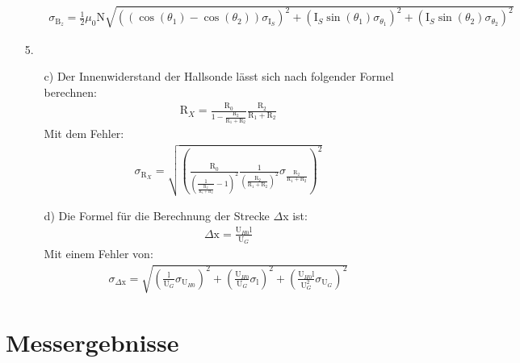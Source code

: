 \documentclass[12pt]{scrartcl}
\begin{document}
\begin{enumerate}
\begin{enumerate}
\begin{align}
\sigma_{\text{B}_z} = \frac{1}{2} \mu_0 \text{N}
\sqrt{\left((\cos(\theta_1) - \cos(\theta_2)) \sigma_{\text{I}_S}\right)^2+
\left(\text{I}_S \sin(\theta_1) \sigma_{\theta_1}\right)^2+
\left(\text{I}_S \sin(\theta_2) \sigma_{\theta_2}\right)^2}
\label{eqn:aufgabe_3_sigma}
\end{align}
\end{enumerate}
\item[5.]
\begin{enumerate}
\item[c)] Der Innenwiderstand der Hallsonde lässt sich nach folgender Formel berechnen:
\begin{align}
\text{R}_X = \frac{\text{R}_0}{1-\frac{\text{R}_2}{\text{R}_1+\text{R}_2}}\frac{\text{R}_2}{\text{R}_1+\text{R}_2}
\label{eqn:innen_widerstand}
\end{align}
Mit dem Fehler:
\begin{align}
\sigma_{\text{R}_X} = \sqrt{\left(\frac{\text{R}_0}{\left(\frac{1}{\frac{\text{R}_2}{\text{R}_1+\text{R}_2}}-1\right)^2}\frac{1}{\left(\frac{\text{R}_2}{\text{R}_1+
\text{R}_2}\right)^2}\sigma_{\frac{\text{R}_2}{\text{R}_1+\text{R}_2}}\right)^2}
\label{eqn:innen_widerstand_sigma}
\end{align}

\item[d)]
Die Formel für die Berechnung der Strecke $\Delta$x ist:
\begin{align}
\Delta \text{x} = \frac{\text{U}_{H0}\text{l}}{\text{U}_G}
\label{eqn:delta}
\end{align}
Mit einem Fehler von:
\begin{align}
\sigma_{\Delta \text{x}} = \sqrt{
\left(\frac{\text{l}}{\text{U}_G}\sigma_{\text{U}_{H0}}\right)^2+
\left(\frac{\text{U}_{H0}}{\text{U}_G}\sigma_{\text{l}}\right)^2+
\left(\frac{\text{U}_{H0}\text{l}}{\text{U}_G^2}\sigma_{\text{U}_G}\right)^2}
\label{eqn:delta_sigma}
\end{align}
\end{enumerate}

\end{enumerate}

\section{Messergebnisse}
\end{document}
